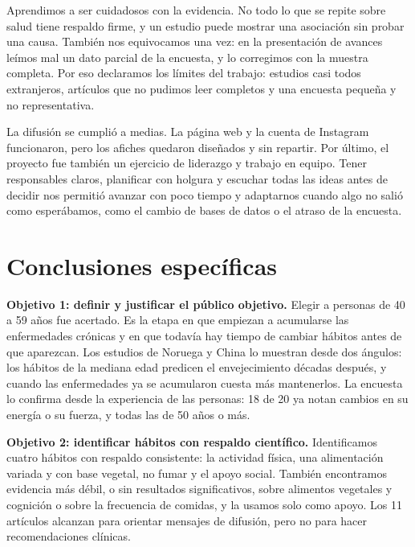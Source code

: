 \documentclass[12pt, letterpaper, table, xcdraw]{extarticle}
\begin{document}
Aprendimos a ser cuidadosos con la evidencia. No todo lo que se repite sobre salud tiene respaldo firme, y un estudio puede mostrar una asociación sin probar una causa. También nos equivocamos una vez: en la presentación de avances leímos mal un dato parcial de la encuesta, y lo corregimos con la muestra completa. Por eso declaramos los límites del trabajo: estudios casi todos extranjeros, artículos que no pudimos leer completos y una encuesta pequeña y no representativa.

La difusión se cumplió a medias. La página web y la cuenta de Instagram funcionaron, pero los afiches quedaron diseñados y sin repartir. Por último, el proyecto fue también un ejercicio de liderazgo y trabajo en equipo. Tener responsables claros, planificar con holgura y escuchar todas las ideas antes de decidir nos permitió avanzar con poco tiempo y adaptarnos cuando algo no salió como esperábamos, como el cambio de bases de datos o el atraso de la encuesta.

\clearpage
{}
{}
\section*{Conclusiones específicas}

\textbf{Objetivo 1: definir y justificar el público objetivo.} Elegir a personas de 40 a 59 años fue acertado. Es la etapa en que empiezan a acumularse las enfermedades crónicas y en que todavía hay tiempo de cambiar hábitos antes de que aparezcan. Los estudios de Noruega y China lo muestran desde dos ángulos: los hábitos de la mediana edad predicen el envejecimiento décadas después, y cuando las enfermedades ya se acumularon cuesta más mantenerlos. La encuesta lo confirma desde la experiencia de las personas: 18 de 20 ya notan cambios en su energía o su fuerza, y todas las de 50 años o más.

\textbf{Objetivo 2: identificar hábitos con respaldo científico.} Identificamos cuatro hábitos con respaldo consistente: la actividad física, una alimentación variada y con base vegetal, no fumar y el apoyo social. También encontramos evidencia más débil, o sin resultados significativos, sobre alimentos vegetales y cognición o sobre la frecuencia de comidas, y la usamos solo como apoyo. Los 11 artículos alcanzan para orientar mensajes de difusión, pero no para hacer recomendaciones clínicas.
\end{document}
